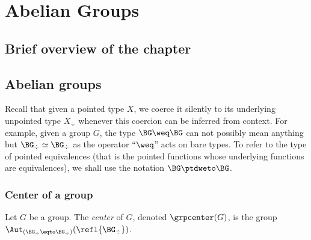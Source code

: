 \chapter{Abelian Groups}
\label{ch:abelian}

\section{Brief overview of the chapter}

\section{Abelian groups}
\label{sec:abelian-groups}

Recall that given a pointed type $X$, we coerce it silently to its
underlying unpointed type $X_\div$ whenever this coercion can be
inferred from context. For example, given a group $G$, the type
$\BG\weq \BG$ can not possibly mean anything but
$\BG_\div\simeq \BG_\div$ as the operator ``$\weq$'' acts on bare
types. To refer to the type of pointed equivalences (that is the
pointed functions whose underlying functions are equivalences), we
shall use the notation $\BG \ptdweto \BG$.%

\subsection{Center of a group}
\label{sec:center-group}

\begin{definition}
  Let $G$ be a group. The {\em center} of $G$, denoted
  $\grpcenter(G)$, is the group
  $\Aut_{(\BG_\div\eqto\BG_\div)}(\refl{\BG_\div})$.%
\end{definition}

